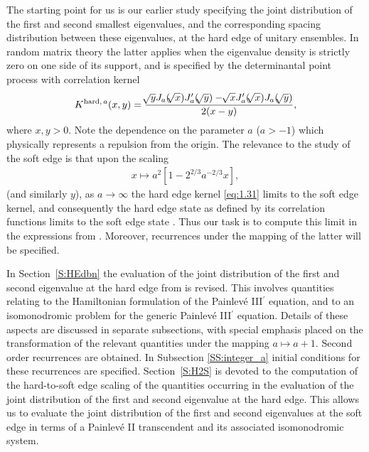 \documentclass[10pt,reqno]{amsart}
\theoremstyle{plain}
\theoremstyle{definition}
\theoremstyle{remark}
\begin{document}
The starting point for us is our earlier study \cite{FW_2007} specifying the joint distribution of the first and second smallest eigenvalues, and 
the corresponding spacing distribution between these eigenvalues, at the hard edge of unitary ensembles. In random matrix theory the latter 
applies when the eigenvalue density is strictly zero on one side of its support, and is specified by the determinantal point process with correlation
kernel
\begin{align}
K^{{\rm hard,} \, a}(x,y) =   \frac{{ \hspace{-0.5pt} \sqrt[]{{y}}}J_a({ \hspace{-0.5pt} \sqrt[]{{x}}})J'_a({ \hspace{-0.5pt} \sqrt[]{{y}}})-{ \hspace{-0.5pt} \sqrt[]{{x}}}J'_a({ \hspace{-0.5pt} \sqrt[]{{x}}})J_a({ \hspace{-0.5pt} \sqrt[]{{y}}})}{2(x-y)} ,    
\label{eq:1.31}
\end{align} 
where $x,y>0$. Note the dependence on the parameter $a$ ($a>-1$) which physically represents a repulsion from the origin. The relevance to 
the study of the soft edge is that upon the scaling 
\begin{align}
x \mapsto a^2 [ 1-2^{2/3}a^{-2/3}x ] ,
\label{eq:1.31a}
\end{align}
(and similarly $y$), as $a \rightarrow \infty$ the hard edge kernel \eqref{eq:1.31} limits to the soft edge kernel, and consequently the 
hard edge state as defined by its correlation functions limits to the soft edge state \cite{BF_2003}. Thus our task is to compute this limit in the 
expressions from \cite{FW_2007}. Moreover, recurrences under the mapping of the latter will be specified.

In Section~\ref{S:HEdbn} the evaluation of the joint distribution of the first and second eigenvalue at the hard edge from \cite{FW_2007} is revised.
This involves quantities relating to the Hamiltonian formulation of the Painlev\'e III$^{\prime}$ equation, and to an isomonodromic problem for 
the generic Painlev\'e III$^{\prime}$ equation. Details of these aspects are discussed in separate subsections, with special emphasis placed on the
transformation of the relevant quantities under the mapping $a \mapsto a +1$. Second order recurrences are obtained. In Subsection \ref{SS:integer_a}
initial conditions for these recurrences are specified. Section~\ref{S:H2S} is devoted to the computation of the hard-to-soft edge scaling of the quantities 
occurring in the evaluation of the joint distribution of the first and second eigenvalue at the hard edge. This allows us to evaluate the joint 
distribution of the first and second eigenvalues at the soft edge in terms of a Painlev\'e II transcendent and its associated isomonodromic system.
 
\end{document}

